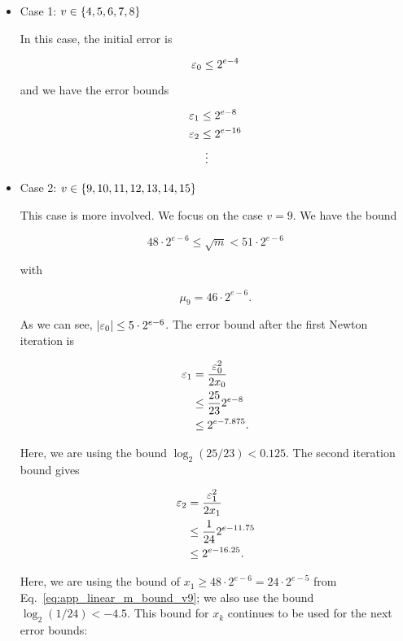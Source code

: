 \begin{itemize}
\item Case 1: $v\in\left\{ 4, 5, 6, 7, 8 \right\}$

In this case, the initial error is

\begin{equation}
    \varepsilon_{0} \le 2^{e-4}
\end{equation}

\noindent
and we have the error bounds

\begin{align}
    \varepsilon_{1} &\le 2^{e-8} \nonumber\\
    \varepsilon_{2} &\le 2^{e-16} \nonumber\\
        &\ \vdots
\end{align}

\item Case 2: $v\in\left\{ 9, 10, 11, 12, 13, 14, 15 \right\}$

This case is more involved.
We focus on the case $v=9$.
We have the bound

\begin{equation}
    48\cdot2^{e-6} \le \sqrt{m} < 51\cdot2^{e-6}
    \label{eq:app_linear_m_bound_v9}
\end{equation}

\noindent
with

\begin{equation}
    \mu_{9} = 46\cdot2^{e-6}.
\end{equation}

\noindent
As we can see, $\left| \varepsilon_{0} \right| \le 5\cdot2^{e-6}$.
The error bound after the first Newton iteration is

\begin{align}
    \varepsilon_{1} &= \frac{\varepsilon_{0}^{2}}{2x_{0}} \nonumber\\
        &\le \frac{25}{23}2^{e-8} \nonumber\\
        &\le 2^{e-7.875}.
\end{align}

\noindent
Here, we are using the bound $\log_{2}(25/23) < 0.125$.
The second iteration bound gives

\begin{align}
    \varepsilon_{2} &= \frac{\varepsilon_{1}^{2}}{2x_{1}} \nonumber\\
        &\le \frac{1}{24}2^{e-11.75} \nonumber\\
        &\le 2^{e-16.25}.
\end{align}

\noindent
Here, we are using the bound of $x_{1}\ge 48\cdot2^{e-6} = 24\cdot2^{e-5}$
from Eq.~\eqref{eq:app_linear_m_bound_v9};
we also use the bound $\log_{2}(1/24) < -4.5$.
This bound for $x_{k}$ continues to be used for the next error bounds:


\end{itemize}
